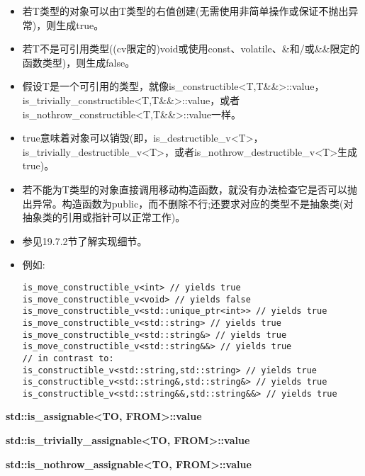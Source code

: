 \begin{itemize}
\item 
若T类型的对象可以由T类型的右值创建(无需使用非简单操作或保证不抛出异常)，则生成true。

\item 
若T不是可引用类型((cv限定的)void或使用const、volatile、\&和/或\&\&限定的函数类型)，则生成false。

\item 
假设T是一个可引用的类型，就像is\_constructible<T,T\&\&>::value，is\_trivially\_constructible<T,T\&\&>::value，或者is\_nothrow\_constructible<T,T\&\&>::value一样。

\item 
true意味着对象可以销毁(即，is\_destructible\_v<T>，is\_trivially\_destructible\_v<T>，或者is\_nothrow\_destructible\_v<T>生成true)。

\item 
若不能为T类型的对象直接调用移动构造函数，就没有办法检查它是否可以抛出异常。构造函数为public，而不删除不行;还要求对应的类型不是抽象类(对抽象类的引用或指针可以正常工作)。

\item 
参见19.7.2节了解实现细节。

\item 
例如:
\begin{lstlisting}[style=styleCXX]
is_move_constructible_v<int> // yields true
is_move_constructible_v<void> // yields false
is_move_constructible_v<std::unique_ptr<int>> // yields true
is_move_constructible_v<std::string> // yields true
is_move_constructible_v<std::string&> // yields true
is_move_constructible_v<std::string&&> // yields true
// in contrast to:
is_constructible_v<std::string,std::string> // yields true
is_constructible_v<std::string&,std::string&> // yields true
is_constructible_v<std::string&&,std::string&&> // yields true
\end{lstlisting}
\end{itemize}

\textbf{std::is\_assignable<TO, FROM>::value}

\textbf{std::is\_trivially\_assignable<TO, FROM>::value}

\textbf{std::is\_nothrow\_assignable<TO, FROM>::value}

